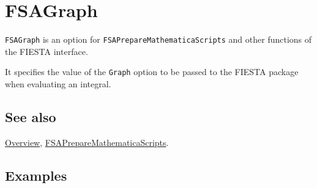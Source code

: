 \documentclass[../FeynHelpersManual.tex]{subfiles}
\begin{document}
\hypertarget{fsagraph}{
\section{FSAGraph}\label{fsagraph}}

\texttt{FSAGraph} is an option for \texttt{FSAPrepareMathematicaScripts}
and other functions of the FIESTA interface.

It specifies the value of the \texttt{Graph} option to be passed to the
FIESTA package when evaluating an integral.

\subsection{See also}

\hyperlink{toc}{Overview},
\hyperlink{fsapreparemathematicascripts}{FSAPrepareMathematicaScripts}.

\subsection{Examples}
\end{document}
